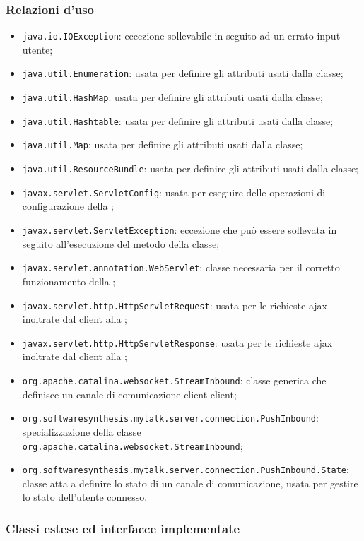 \subsubsection*{Relazioni d'uso}
\begin{itemize}
	\item \texttt{java.io.IOException}: eccezione sollevabile in seguito ad un errato input utente;
	\item \texttt{java.util.Enumeration}: usata per definire gli attributi usati dalla classe;
	\item \texttt{java.util.HashMap}: usata per definire gli attributi usati dalla classe;
	\item \texttt{java.util.Hashtable}: usata per definire gli attributi usati dalla classe;
	\item \texttt{java.util.Map}: usata per definire gli attributi usati dalla classe;
	\item \texttt{java.util.ResourceBundle}: usata per definire gli attributi usati dalla classe;
	\item \texttt{javax.servlet.ServletConfig}: usata per eseguire delle operazioni di configurazione della ;
	\item \texttt{javax.servlet.ServletException}: eccezione che può essere sollevata in seguito all'esecuzione del metodo  della classe;
	\item \texttt{javax.servlet.annotation.WebServlet}: classe necessaria per il corretto funzionamento della ;
	\item \texttt{javax.servlet.http.HttpServletRequest}: usata per le richieste ajax inoltrate dal client alla ;
	\item \texttt{javax.servlet.http.HttpServletResponse}: usata per le richieste ajax inoltrate dal client alla ;
	\item \texttt{org.apache.catalina.websocket.StreamInbound}: classe generica che definisce un canale di comunicazione client-client;
	\item \texttt{org.softwaresynthesis.mytalk.server.connection.PushInbound}: specializzazione della classe \texttt{org.apache.catalina.websocket.StreamInbound};
	\item \texttt{org.softwaresynthesis.mytalk.server.connection.PushInbound.State}: classe atta a definire lo stato di un canale di comunicazione, usata per gestire lo stato dell'utente connesso.
\end{itemize}

\subsubsection*{Classi estese ed interfacce implementate}

